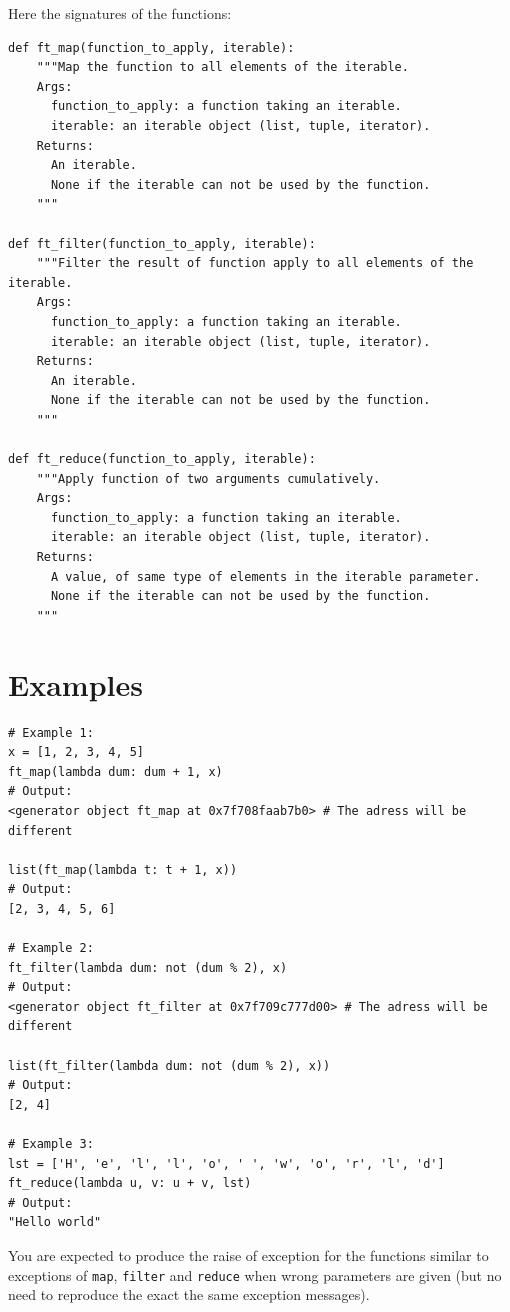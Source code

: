 \documentclass{42-en}
\begin{document}
Here the signatures of the functions:

\begin{verbatim}
def ft_map(function_to_apply, iterable):
	"""Map the function to all elements of the iterable.
	Args:
	  function_to_apply: a function taking an iterable.
	  iterable: an iterable object (list, tuple, iterator).
	Returns:
	  An iterable.
	  None if the iterable can not be used by the function.
	"""

def ft_filter(function_to_apply, iterable):
	"""Filter the result of function apply to all elements of the iterable.
	Args:
	  function_to_apply: a function taking an iterable.
	  iterable: an iterable object (list, tuple, iterator).
	Returns:
	  An iterable.
	  None if the iterable can not be used by the function.
	"""

def ft_reduce(function_to_apply, iterable):
	"""Apply function of two arguments cumulatively.
	Args:
	  function_to_apply: a function taking an iterable.
	  iterable: an iterable object (list, tuple, iterator).
	Returns:
	  A value, of same type of elements in the iterable parameter.
	  None if the iterable can not be used by the function.
	"""
\end{verbatim}

\section*{Examples}

\begin{verbatim}
# Example 1:
x = [1, 2, 3, 4, 5]
ft_map(lambda dum: dum + 1, x)
# Output:
<generator object ft_map at 0x7f708faab7b0> # The adress will be different

list(ft_map(lambda t: t + 1, x))
# Output:
[2, 3, 4, 5, 6]

# Example 2:
ft_filter(lambda dum: not (dum % 2), x)
# Output:
<generator object ft_filter at 0x7f709c777d00> # The adress will be different

list(ft_filter(lambda dum: not (dum % 2), x))
# Output:
[2, 4]

# Example 3:
lst = ['H', 'e', 'l', 'l', 'o', ' ', 'w', 'o', 'r', 'l', 'd']
ft_reduce(lambda u, v: u + v, lst)
# Output:
"Hello world"
\end{verbatim}

You are expected to produce the raise of exception for the functions similar to exceptions of
\texttt{map}, \texttt{filter} and \texttt{reduce} when wrong parameters are given (but no need
to reproduce the exact the same exception messages).
\end{document}
